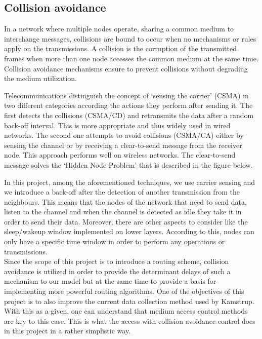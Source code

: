 \subsection{Collision avoidance}

In a network where multiple nodes operate, sharing a common medium to interchange messages, collisions are bound to occur when no mechanisms or rules apply on the transmissions. A collision is the corruption of the transmitted frames when more than one node accesses the common medium at the same time. Collision avoidance mechanisms ensure to prevent collisions without degrading the medium utilization.

Telecommunications distinguish the concept of `sensing the carrier' (CSMA) in two different categories according the actions they perform after sending it. The first detects the collisions (CSMA/CD) and retransmits the data after a random back-off interval. This is more appropriate and thus widely used in wired networks. The second one attempts to avoid collisions (CSMA/CA) either by sensing the channel or by receiving a clear-to-send message from the receiver node. This approach performs well on wireless networks. The clear-to-send message solves the `Hidden Node Problem' that is described in the figure below.



In this project, among the aforementioned techniques, we use carrier sensing and we introduce a back-off after the detection of another transmission from the neighbours. This means that the nodes of the network that need to send data, listen to the channel and when the channel is detected as idle they take it in order to send their data.  Moreover, there are other aspects to consider like the sleep/wakeup window implemented on lower layers. According to this, nodes can only have a specific time window in order to perform any operations or transmissions.\\
Since the scope of this project is to introduce a routing scheme, collision avoidance is utilized in order to provide the determinant delays of such a mechanism to our model but at the same time to provide a basis for implementing more powerful routing algorithms. One of the objectives of this project is to also improve the current data collection method used by Kamstrup. With this as a given, one can understand that medium access control methods are key to this case. This is what the access with collision avoidance control does in this project in a rather simplistic way.

